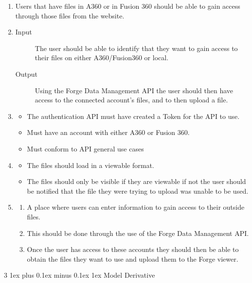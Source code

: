 \documentclass[letterpaper, 10pt, draftclsnofoot, compsoc, onecolumn]{IEEEtran}
\makeatletter
\def\subsubsection{\@startsection{subsubsection}%
                                 {3}%
                                 {\z@}%
                                 {1ex plus 0.1ex minus 0.1ex}%
                                 {1ex}%
                                 {\normalfont\normalsize}}%
\makeatother
\begin{document}
\begin{enumerate}
	\item Users that have files in A360 or in Fusion 360 should be able to gain access through those files from the
	website.

	\item
	\begin{description} 
		\item[Input] The user should be able to identify that they want to gain access to their files on either A360/Fusion360 or local. 
		\item[Output] Using the Forge Data Management API the user should then have access to the connected account's files, and to then upload a file.
	\end{description}

	\item
	\begin{itemize}
		\item The authentication API must have created a Token for the API to use.
		\item Must have an account with either A360 or Fusion 360. 
		\item Must conform to API general use cases
	\end{itemize}

	\item
	\begin{itemize}
		\item The files should load in a viewable format.
		\item The files should only be visible if they are viewable if not the user should be notified that the file
			they were trying to upload was unable to be used.
	\end{itemize}
	
	\item 
	\begin{enumerate}
		\item A place where users can enter information to gain access to their outside files. 
		\item This should be done through the use of the Forge Data Management API. 
		\item Once the user has access to these accounts they should then be able to obtain the 
		files they want to use and upload them to the Forge viewer.
	\end{enumerate}
\end{enumerate}

\subsubsection{Model Derivative}
\end{document}
